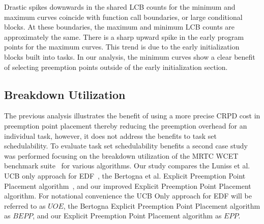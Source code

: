 Drastic spikes downwards in the shared LCB counts for the minimum and maximum curves coincide with function call boundaries, or large conditional blocks. At these boundaries, the maximum and minimum LCB counts are approximately the same. There is a sharp upward spike in the early program points for the maximum curves. This trend is due to the early initialization blocks built into tasks. In our analysis, the minimum curves show a clear benefit of selecting preemption points outside of the early initialization section.
\vspace{-10pt}
\subsection{Breakdown Utilization}
The previous analysis illustrates the benefit of using a more precise CRPD cost in preemption point placement thereby reducing the preemption overhead
for an individual task, however, it does not address the benefits to task set schedulability. To evaluate task set schedulability benefits a second case study was performed focusing on the breakdown utilization of the MRTC WCET benchmark suite~\cite{mrtc:01} for various algorithms.  Our study compares the Luniss et al. UCB only approach for EDF~\cite{lunniss:13}, the Bertogna et al. Explicit Preemption Point Placement algorithm~\cite{bertogna:11}, and our improved Explicit Preemption Point Placement algorithm. For notational convenience the UCB Only approach for EDF will be referred to as ${UOE}$, the Bertogna Explicit Preemption Point Placement algorithm as ${BEPP}$, and our Explicit Preemption Point Placement algorithm as ${EPP}$.

